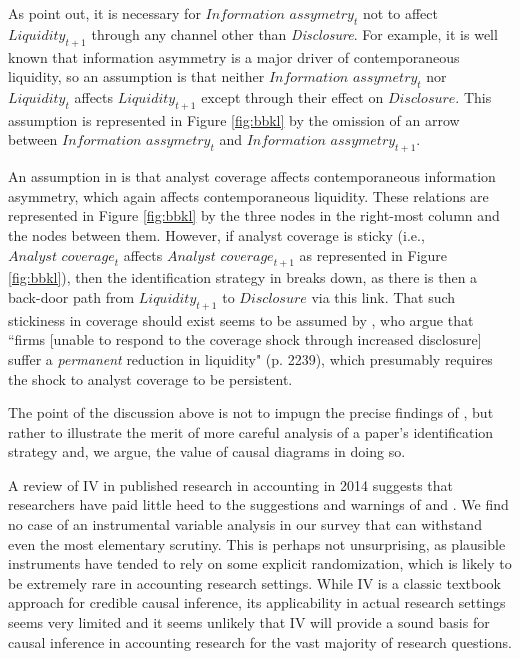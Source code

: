\documentclass[11pt,reqno]{amsart}
\begin{document}
As \citet{Balakrishnan:2014js} point out, it is necessary for $\textit{Information assymetry}_t$ not to affect $\textit{Liquidity}_{t+1}$ through any channel other than \textit{Disclosure}.
For example, it is well known that information asymmetry is a major driver of contemporaneous liquidity, so an assumption is that neither $\textit{Information assymetry}_t$ nor $\textit{Liquidity}_t$ affects $\textit{Liquidity}_{t+1}$ except through their effect on $\textit{Disclosure}$. 
This assumption is represented in Figure \ref{fig:bbkl} by the omission of an arrow between $\textit{Information assymetry}_t$ and $\textit{Information assymetry}_{t+1}$.

An assumption in \citet{Kelly:2012ih} is that analyst coverage affects contemporaneous information asymmetry, which again affects contemporaneous liquidity.
These relations are represented in Figure \ref{fig:bbkl} by the three nodes in the right-most column and the nodes between them.
However, if analyst coverage is sticky (i.e., $\textit{Analyst coverage}_t$ affects $\textit{Analyst coverage}_{t+1}$ as represented in Figure \ref{fig:bbkl}), then the identification strategy in \citet{Balakrishnan:2014js} breaks down, as there is then a back-door path from $\textit{Liquidity}_{t+1}$ to $\textit{Disclosure}$ via this link.
That such stickiness in coverage should exist seems to be assumed by \citet{Balakrishnan:2014js}, who argue that ``firms [unable to respond  to the coverage shock through increased disclosure] suffer a \emph{permanent} reduction in liquidity" (p. 2239), which presumably requires the shock to analyst coverage to be persistent.

The point of the discussion above is not to impugn the precise findings of \citet{Balakrishnan:2014js}, but rather to illustrate the merit of more careful analysis of a paper's identification strategy and, we argue, the value of causal diagrams in doing so.

A review of IV in published research in accounting in 2014 suggests that researchers have paid little heed to the suggestions and warnings of  \citet{Larcker:2010fq} and \citet{Roberts:2013cz}.
We find no case of an instrumental variable analysis in our survey that can withstand even the most elementary scrutiny.
This is perhaps not unsurprising, as plausible instruments have tended to rely on some explicit randomization, which is likely to be extremely rare in accounting research settings.
While IV is a classic textbook approach for credible causal inference, its applicability in actual research settings seems very limited and it seems unlikely that IV will provide a sound basis for causal inference in accounting research for the vast majority of research questions.
 
\end{document}
